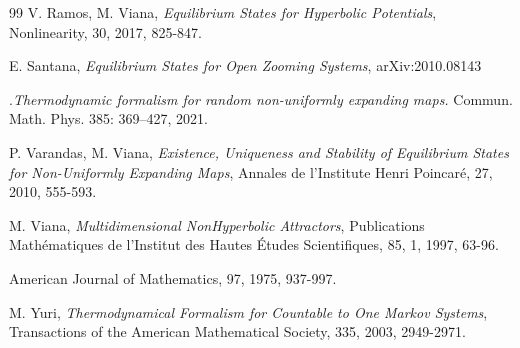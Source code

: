 \documentclass[12pt,a4paper]{amsart}
\theoremstyle{plain}
\begin{document}
\begin{thebibliography}{99}
		 {\sc V. Ramos, M. Viana}, {\it Equilibrium States for Hyperbolic Potentials}, Nonlinearity, 30, 2017, 825-847. 
		
		 {\sc E. Santana}, {\it Equilibrium States for Open Zooming Systems}, arXiv:2010.08143
		
		
		
		
		
		
		.{\it Thermodynamic formalism for random non-uniformly expanding maps.} Commun. Math. Phys. 385: 369--427, 2021.
		
		 {\sc P. Varandas, M. Viana}, {\it Existence, Uniqueness and Stability of Equilibrium States for Non-Uniformly Expanding Maps}, Annales de l'Institute Henri Poincar\' e, 27, 2010, 555-593.
		
		 {\sc M. Viana}, {\it Multidimensional NonHyperbolic Attractors},  Publications Math\' ematiques de l'Institut des Hautes \' Etudes Scientifiques, 85, 1, 1997, 63-96. 
		
		American Journal of Mathematics, 97, 1975, 937-997. 
		
		 {\sc M. Yuri}, {\it Thermodynamical Formalism for Countable to One Markov Systems}, Transactions of the American Mathematical Society, 335, 2003, 2949-2971.
		
		
	\end{thebibliography}
	
	
	
\end{document}
